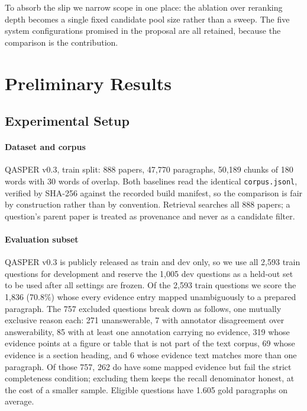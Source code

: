 \documentclass[sigconf,nonacm]{acmart}
\begin{document}
To absorb the slip we narrow scope in one place: the ablation over reranking
depth becomes a single fixed candidate pool size rather than a sweep. The five
system configurations promised in the proposal are all retained, because the
comparison is the contribution.

\section{Preliminary Results}

\subsection{Experimental Setup}
\label{sec:setup}

\paragraph{Dataset and corpus} QASPER v0.3, train split: 888 papers, 47{,}770
paragraphs, 50{,}189 chunks of 180 words with 30 words of overlap. Both baselines
read the identical \texttt{corpus.jsonl}, verified by SHA-256 against the
recorded build manifest, so the comparison is fair by construction rather than by
convention. Retrieval searches all 888 papers; a question's parent paper is
treated as provenance and never as a candidate filter.

\paragraph{Evaluation subset} QASPER v0.3 is publicly released as train and dev
only, so we use all 2{,}593 train questions for development and reserve the
1{,}005 dev questions as a held-out set to be used after all settings are frozen.
Of the 2{,}593 train questions we score the 1{,}836 (70.8\%) whose every evidence
entry mapped unambiguously to a prepared paragraph. The 757 excluded questions
break down as follows, one mutually exclusive reason each: 271 unanswerable, 7
with annotator disagreement over answerability, 85 with at least one annotation
carrying no evidence, 319 whose evidence points at a figure or table that is not
part of the text corpus, 69 whose evidence is a section heading, and 6 whose
evidence text matches more than one paragraph. Of those 757, 262 do have some
mapped evidence but fail the strict completeness condition; excluding them keeps
the recall denominator honest, at the cost of a smaller sample. Eligible
questions have 1.605 gold paragraphs on average.
\end{document}
